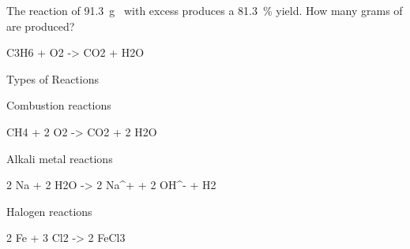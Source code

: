 \documentclass[notes=show]{beamer}
\begin{document}
\begin{onyourown}[20em]
	The reaction of \SI{91.3}{\gram}~ with excess  produces
	a \SI{81.3}{\percent} yield. How many grams of  are produced?
	\begin{reaction*}
		C3H6\gas{} + O2\gas{} -> CO2\gas{} + H2O\lqd{}
	\end{reaction*}
\end{onyourown}

%
%
%
%
%
%
%
%
%
%
%
%
%
%

\begin{frame}{Types of Reactions}
	\begin{block}{Combustion reactions}
		\begin{reaction*}
			CH4\gas{} + 2 O2\gas{} -> CO2\gas{} + 2
			H2O\gas{}
		\end{reaction*}
	\end{block}

	\begin{block}{Alkali metal reactions}
		\begin{reaction*}
			2 Na\sld{} + 2 H2O\lqd{} -> 2
			Na^{+}\aq{} + 2 OH^{-}\aq{} + H2\gas{}
		\end{reaction*}
	\end{block}

	\begin{block}{Halogen reactions}
		\begin{reaction*}
			2 Fe\sld{} + 3 Cl2\gas{} -> 2
			FeCl3\sld{}
		\end{reaction*}
	\end{block}
\end{frame}
\end{document}

